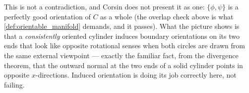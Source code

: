\begin{ainote}
This is not a contradiction, and Corsin does not present it as one: $\{\phi,\psi\}$ is a
perfectly good orientation of $C$ as a whole (the overlap check above is what
\cref{def:orientable_manifold} demands, and it passes). What the picture shows is that a
\emph{consistently} oriented cylinder induces boundary orientations on its two ends that look
like opposite rotational senses when both circles are drawn from the same external viewpoint
--- exactly the familiar fact, from the divergence theorem, that the outward normal at the two
ends of a solid cylinder points in opposite $x$-directions. Induced orientation is doing its
job correctly here, not failing.
\end{ainote}
